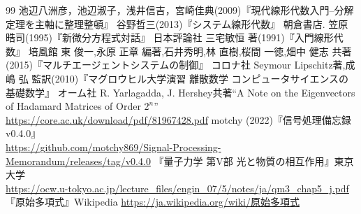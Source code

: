 \documentclass[titlepage]{ltjsreport}
\theoremstyle{definition} %
\begin{document}
    \maketitle
    {\scriptsize \tableofcontents}
    
    
    
    
    
    
    
    
    
    
    
    \begin{thebibliography}{99}
        池辺八洲彦，池辺淑子，浅井信吉，宮崎佳典(2009)『現代線形代数入門--分解定理を主軸に整理整頓』
        谷野哲三(2013)『システム線形代数』 朝倉書店.
        笠原晧司(1995)『新微分方程式対話』 日本評論社
        三宅敏恒 著(1991)『入門線形代数』 培風館
        東 俊一,永原 正章 編著,石井秀明,林 直樹,桜間 一徳,畑中 健志 共著(2015)『マルチエージェントシステムの制御』 コロナ社
        Seymour Lipschitz著,成嶋 弘 監訳(2010)『マグロウヒル大学演習 離散数学 コンピュータサイエンスの基礎数学』 オーム社
         R. Yarlagadda, J. Hershey共著``A Note on the Eigenvectors of Hadamard Matrices of Order $2^n$'' \url{https://core.ac.uk/download/pdf/81967428.pdf}
         motchy (2022)『信号処理備忘録v0.4.0』\\ \url{https://github.com/motchy869/Signal-Processing-Memorandum/releases/tag/v0.4.0}
        『量子力学 第V部 光と物質の相互作用』東京大学\\ \url{https://ocw.u-tokyo.ac.jp/lecture_files/engin_07/5/notes/ja/qm3_chap5_j.pdf}
        『原始多項式』Wikipedia \url{https://ja.wikipedia.org/wiki/原始多項式}
    \end{thebibliography}
\end{document}
